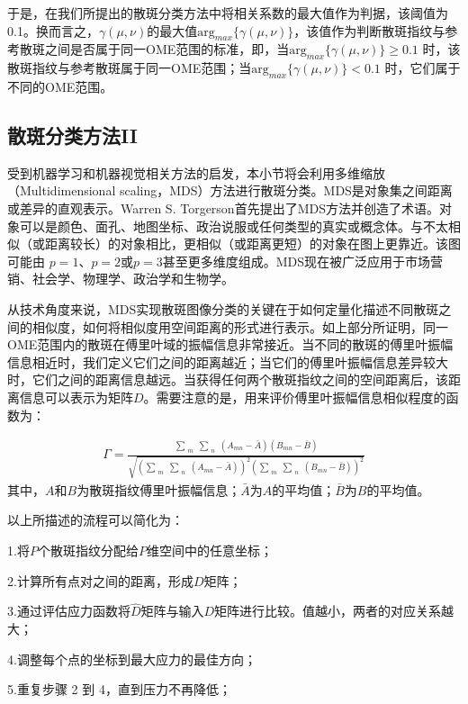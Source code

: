 于是，在我们所提出的散斑分类方法中将相关系数的最大值作为判据，该阈值为0.1。换而言之，$\gamma (\mu,\nu)$的最大值$\mbox{arg}_{max} \{ \gamma (\mu,\nu) \}$，该值作为判断散斑指纹与参考散斑之间是否属于同一OME范围的标准，即，当$\mbox{arg}_{max} \{ \gamma (\mu,\nu) \} \geq 0.1 $ 时，该散斑指纹与参考散斑属于同一OME范围；当$\mbox{arg}_{max} \{ \gamma (\mu,\nu) \} < 0.1 $ 时，它们属于不同的OME范围。

\subsection{散斑分类方法II}\label{speckle_classify}

受到机器学习和机器视觉相关方法的启发，本小节将会利用多维缩放（Multidimensional scaling，MDS）方法进行散斑分类。MDS是对象集之间距离或差异的直观表示。Warren S. Torgerson首先提出了MDS方法并创造了术语\cite{torgerson_multidimensional_1952}。对象可以是颜色、面孔、地图坐标、政治说服或任何类型的真实或概念体。与不太相似（或距离较长）的对象相比，更相似（或距离更短）的对象在图上更靠近。该图可能由 $p = 1$、$p = 2$或$p = 3$甚至更多维度组成。MDS现在被广泛应用于市场营销、社会学、物理学、政治学和生物学\cite{de_leeuw_modern_2005}。

从技术角度来说，MDS实现散斑图像分类的关键在于如何定量化描述不同散斑之间的相似度，如何将相似度用空间距离的形式进行表示。如上部分所证明，同一OME范围内的散斑在傅里叶域的振幅信息非常接近。当不同的散斑的傅里叶振幅信息相近时，我们定义它们之间的距离越近；当它们的傅里叶振幅信息差异较大时，它们之间的距离信息越远。当获得任何两个散斑指纹之间的空间距离后，该距离信息可以表示为矩阵$D$。需要注意的是，用来评价傅里叶振幅信息相似程度的函数为：

\begin{equation}
\begin{aligned}
\Gamma = \frac{\sum_{\substack{m}}\sum_{\substack{n}} (A_{mn}-\bar{A}) ( B_{mn}-\bar{B})}{\sqrt{(\sum_{\substack{m}}\sum_{\substack{n}} (A_{mn}-\bar{A}))^2 (\sum_{\substack{m}}\sum_{\substack{n}}( B_{mn}-\bar{B}))^2}}
\label{eq:6.6}
\end{aligned}
\end{equation}
其中，$A$和$B$为散斑指纹傅里叶振幅信息；$\bar{A}$为$A$的平均值；$\bar{B}$为$B$的平均值。

以上所描述的流程可以简化为：\par
1.将$P$个散斑指纹分配给$P$维空间中的任意坐标；\par
2.计算所有点对之间的距离，形成$D$矩阵；\par
3.通过评估应力函数将$\hat{D}$矩阵与输入$D$矩阵进行比较。值越小，两者的对应关系越大；\par
4.调整每个点的坐标到最大应力的最佳方向；\par
5.重复步骤 2 到 4，直到压力不再降低；\par

